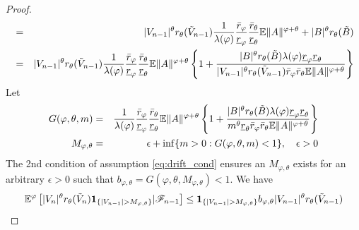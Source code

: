 \documentclass[aoas,preprint]{imsart}
\numberwithin{equation}{section}
\theoremstyle{plain}
\begin{document}
\begin{proof}
\begin{eqnarray*}
    &=&
    |V_{n-1}|^\theta
    r_\theta(\tilde V_{n-1})
    {1 \over \lambda(\varphi)}
    {\bar r_\varphi \over \underline r_\varphi}
    {\bar r_\theta \over \underline r_\theta}
    \mathbb{E} \| A \|^{\varphi + \theta}
    + |B|^\theta r_{\theta}(\tilde B) \\
    &=&
    |V_{n-1}|^\theta
    r_\theta(\tilde V_{n-1})
    {1 \over \lambda(\varphi)}
    {\bar r_\varphi \over \underline r_\varphi}
    {\bar r_\theta \over \underline r_\theta}
    \mathbb{E} \| A \|^{\varphi + \theta}
    \left\{
      1 + 
      {|B|^\theta r_{\theta}(\tilde B) \lambda(\varphi) \underline r_\varphi \underline r_\theta
        \over
        |V_{n-1}|^\theta r_\theta(\tilde V_{n-1}) \bar r_\varphi \bar
        r_\theta \mathbb{E} \| A \|^{\varphi + \theta}
      }
    \right\}
  \end{eqnarray*}
  Let
  \begin{eqnarray*}
    G(\varphi, \theta, m)
    &=&
    {1 \over \lambda(\varphi)}
    {\bar r_\varphi \over \underline r_\varphi}
    {\bar r_\theta \over \underline r_\theta}
    \mathbb{E} \| A \|^{\varphi + \theta}
    \left\{
    1 + 
    {|B|^\theta r_{\theta}(\tilde B)
     \lambda(\varphi) \underline r_\varphi \underline r_\theta
     \over
     m^\theta \underline r_\theta \bar r_\varphi \bar r_\theta 
     \mathbb{E} \|A \|^{\varphi + \theta}
    }
    \right\} \\
    M_{\varphi, \theta}
    &=&
    \epsilon + \inf\{m > 0: G(\varphi, \theta, m) < 1\},
    \quad \epsilon > 0
  \end{eqnarray*}
  The 2nd condition of assumption \eqref{eq:drift_cond} ensures an
  $M_{\varphi, \theta}$ exists for an arbitrary $\epsilon > 0$ such that
  $b_{\varphi, \theta} = G(\varphi, \theta, M_{\varphi, \theta}) < 1$.
  We have
  \[
  \mathbb{E}^\varphi
  \left[
    |V_n|^\theta r_{\theta}(\tilde V_n)
    \mathbf{1}_{\{|V_{n-1}| > M_{\varphi, \theta}\}} | \mathscr F_{n-1}
  \right]
  \leq
  \mathbf{1}_{\{|V_{n-1}| > M_{\varphi, \theta}\}}
  b_{\varphi, \theta}
  |V_{n-1}|^\theta
  r_\theta(\tilde V_{n-1})
  \]


\end{proof}
\end{document}

